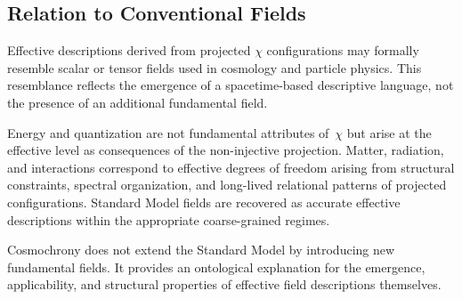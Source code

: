 \subsection{Relation to Conventional Fields}
\label{subsec:relation-to-conventional-fields}

Effective descriptions derived from projected $\chi$ configurations may
formally resemble scalar or tensor fields used in cosmology and particle
physics.
This resemblance reflects the emergence of a spacetime-based descriptive
language, not the presence of an additional fundamental field.

Energy and quantization are not fundamental attributes of~$\chi$ but arise
at the effective level as consequences of the non-injective projection.
Matter, radiation, and interactions correspond to effective degrees of
freedom arising from structural constraints, spectral organization, and
long-lived relational patterns of projected configurations.
Standard Model fields are recovered as accurate effective descriptions
within the appropriate coarse-grained regimes.

Cosmochrony does not extend the Standard Model by introducing new
fundamental fields.
It provides an ontological explanation for the emergence, applicability, and
structural properties of effective field descriptions themselves.
